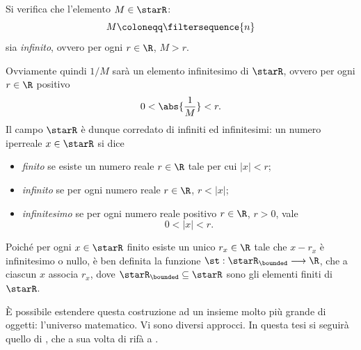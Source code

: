 Si verifica che l'elemento $ M \in \starR $: \begin{equation*}
    M \coloneqq \filtersequence{n}
\end{equation*}sia \emph{infinito}, ovvero per ogni $ r \in \R $, $ M > r $. 

Ovviamente quindi $ 1/M $ sarà un elemento infinitesimo di $ \starR $, ovvero per ogni $ r \in \R$ positivo \begin{equation*}
    0 < \abs{\frac{1}{M}} <r.
\end{equation*}Il campo $ \starR $ è dunque corredato di infiniti ed infinitesimi: un numero iperreale $ x \in \starR $ si dice \begin{itemize}
    \item \emph{finito} se esiste un numero reale $ r \in \R $ tale per cui $ |x|<r $;
    \item \emph{infinito} se per ogni numero reale $ r \in \R$, $ r<|x| $;
    \item \emph{infinitesimo} se per ogni numero reale positivo $ r \in \R $, $ r>0 $, vale \begin{equation*}
        0 < |x| < r.
    \end{equation*}
\end{itemize}
Poiché per ogni $ x \in \starR $ finito esiste un unico $ r_{x}  \in \R $ tale che $ x-r_{x}  $ è infinitesimo o nullo, è ben definita la funzione $ \st: \starR_{\bounded}  \longrightarrow \R $, che a ciascun $ x $ associa $ r_{x}  $, dove $ \starR_{\bounded} \subseteq \starR $ sono gli elementi finiti di $ \starR $.

È possibile estendere questa costruzione ad un insieme molto più grande di oggetti: l'universo matematico. Vi sono diversi approcci. In questa tesi si seguirà quello di \cite{nowik_differential_2015}, che a sua volta di rifà a \cite{chang_model_2012}.

